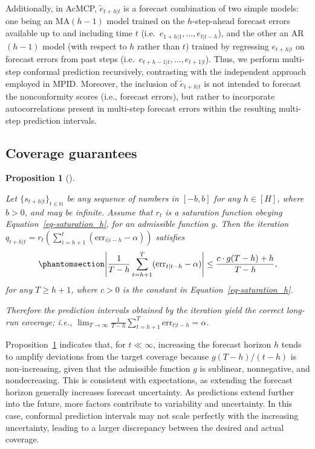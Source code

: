 \documentclass[
  11pt,
  a4paper,
]{article}
\theoremstyle{plain}
\newtheorem{proposition}{Proposition}[section]
\theoremstyle{remark}
\begin{document}
Additionally, in AcMCP, \(\tilde{e}_{t+h|t}\) is a forecast combination
of two simple models: one being an MA\((h-1)\) model trained on the
\(h\)-step-ahead forecast errors available up to and including time
\(t\) (i.e.~\(e_{1+h|1}, \ldots, e_{t|t-h}\)), and the other an
AR\((h-1)\) model (with respect to \(h\) rather than \(t\)) trained by
regressing \(e_{t+h|t}\) on forecast errors from past steps
(i.e.~\(e_{t+h-1|t}, \ldots, e_{t+1|t}\)). Thus, we perform multi-step
conformal prediction recursively, contrasting with the independent
approach employed in MPID. Moreover, the inclusion of
\(\tilde{e}_{t+h|t}\) is not intended to forecast the nonconformity
scores (i.e., forecast errors), but rather to incorporate
autocorrelations present in multi-step forecast errors within the
resulting multi-step prediction intervals.

\subsection{Coverage guarantees}\label{coverage-guarantees}

\begin{proposition}[]\protect\hypertarget{prp-cov_rt}{}\label{prp-cov_rt}

Let \(\{s_{t+h|t}\}_{t\in\mathbb{N}}\) be any sequence of numbers in
\([-b, b]\) for any \(h\in[H]\), where \(b>0\), and may be infinite.
Assume that \(r_t\) is a saturation function obeying
Equation~\ref{eq-saturation_h}, for an admissible function \(g\). Then
the iteration
\(q_{t+h|t}=r_t\left(\sum_{i=h+1}^t(\mathrm{err}_{i|i-h}-\alpha)\right)\)
satisfies \begin{equation}\phantomsection\label{eq-cov_rt}{
\left|\frac{1}{T-h}\sum_{t=h+1}^{T}(\mathrm{err}_{t|t-h}-\alpha)\right| \leq \frac{c \cdot g(T-h) + h}{T-h},
}\end{equation} for any \(T \geq h+1\), where \(c>0\) is the constant in
Equation~\ref{eq-saturation_h}.

Therefore the prediction intervals obtained by the iteration yield the
correct long-run coverage; i.e.,
\(\lim _{T \rightarrow \infty} \frac{1}{T-h} \sum_{t=h+1}^T \mathrm{err}_{t|t-h} = \alpha\).

\end{proposition}

Proposition~\ref{prp-cov_rt} indicates that, for \(t \ll \infty\),
increasing the forecast horizon \(h\) tends to amplify deviations from
the target coverage because \(g(T-h)/(t-h)\) is non-increasing, given
that the admissible function \(g\) is sublinear, nonnegative, and
nondecreasing. This is consistent with expectations, as extending the
forecast horizon generally increases forecast uncertainty. As
predictions extend further into the future, more factors contribute to
variability and uncertainty. In this case, conformal prediction
intervals may not scale perfectly with the increasing uncertainty,
leading to a larger discrepancy between the desired and actual coverage.
\end{document}
